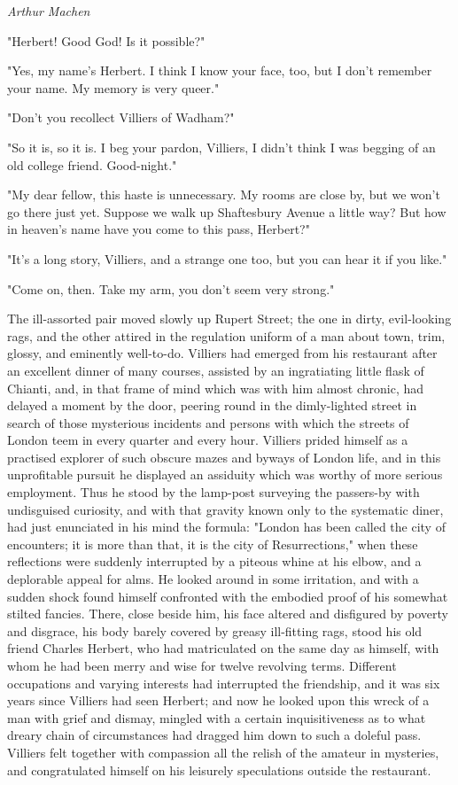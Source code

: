 \documentclass[openany]{book} %
\begin{document}
\textit{Arthur Machen}

\parag

\bigskip

"Herbert! Good God! Is it possible?"

\bigskip
"Yes, my name's Herbert. I think I know your face, too, but I don't remember your name. My memory is very queer."

\bigskip
"Don't you recollect Villiers of Wadham?"

\bigskip
"So it is, so it is. I beg your pardon, Villiers, I didn't think I was begging of an old college friend. Good-night."

\bigskip
"My dear fellow, this haste is unnecessary. My rooms are close by, but we won't go there just yet. Suppose we walk up Shaftesbury Avenue a little way? But how in heaven's name have you come to this pass, Herbert?"

\bigskip
"It's a long story, Villiers, and a strange one too, but you can hear it if you like."

\bigskip
"Come on, then. Take my arm, you don't seem very strong."

\bigskip
The ill-assorted pair moved slowly up Rupert Street; the one in dirty, evil-looking rags, and the other attired in the regulation uniform of a man about town, trim, glossy, and eminently well-to-do. Villiers had emerged from his restaurant after an excellent dinner of many courses, assisted by an ingratiating little flask of Chianti, and, in that frame of mind which was with him almost chronic, had delayed a moment by the door, peering round in the dimly-lighted street in search of those mysterious incidents and persons with which the streets of London teem in every quarter and every hour. Villiers prided himself as a practised explorer of such obscure mazes and byways of London life, and in this unprofitable pursuit he displayed an assiduity which was worthy of more serious employment. Thus he stood by the lamp-post surveying the passers-by with undisguised curiosity, and with that gravity known only to the systematic diner, had just enunciated in his mind the formula: "London has been called the city of encounters; it is more than that, it is the city of Resurrections," when these reflections were suddenly interrupted by a piteous whine at his elbow, and a deplorable appeal for alms. He looked around in some irritation, and with a sudden shock found himself confronted with the embodied proof of his somewhat stilted fancies. There, close beside him, his face altered and disfigured by poverty and disgrace, his body barely covered by greasy ill-fitting rags, stood his old friend Charles Herbert, who had matriculated on the same day as himself, with whom he had been merry and wise for twelve revolving terms. Different occupations and varying interests had interrupted the friendship, and it was six years since Villiers had seen Herbert; and now he looked upon this wreck of a man with grief and dismay, mingled with a certain inquisitiveness as to what dreary chain of circumstances had dragged him down to such a doleful pass. Villiers felt together with compassion all the relish of the amateur in mysteries, and congratulated himself on his leisurely speculations outside the restaurant.
\end{document}
